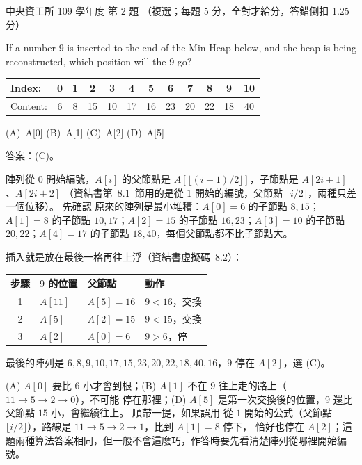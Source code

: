 \begin{pastexam}[label={px:ncu-109-dsa-02}]{中央資工所 109 學年度 第 2 題}
（複選；每題 5 分，全對才給分，答錯倒扣 1.25 分）

If a number 9 is inserted to the end of the Min-Heap below, and the heap is being reconstructed,
which position will the 9 go?
\begin{center}
\begin{tabular}{|l|c|c|c|c|c|c|c|c|c|c|c|}
\hline
Index: & 0 & 1 & 2 & 3 & 4 & 5 & 6 & 7 & 8 & 9 & 10 \\ \hline
Content: & 6 & 8 & 15 & 10 & 17 & 16 & 23 & 20 & 22 & 18 & 40 \\ \hline
\end{tabular}
\end{center}
(A)~A[0] \qquad (B)~A[1] \qquad (C)~A[2] \qquad (D)~A[5]
\end{pastexam}

\begin{pastsoln}
答案：(C)。

陣列從 $0$ 開始編號，$A[i]$ 的父節點是 $A[\lfloor (i-1)/2 \rfloor]$，子節點是 $A[2i+1]$、$A[2i+2]$
（資結書第~8.1~節用的是從 $1$ 開始的編號，父節點 $\lfloor i/2 \rfloor$，兩種只差一個位移）。 先確認
原來的陣列是最小堆積：$A[0] = 6$ 的子節點 $8, 15$；$A[1] = 8$ 的子節點 $10, 17$；$A[2] = 15$ 的子節點
$16, 23$；$A[3] = 10$ 的子節點 $20, 22$；$A[4] = 17$ 的子節點 $18, 40$，每個父節點都不比子節點大。

插入就是放在最後一格再往上浮（資結書虛擬碼~8.2）：
\begin{center}
\small
\begin{tabular}{clll}
\toprule
步驟 & $9$ 的位置 & 父節點 & 動作 \\
\midrule
1 & $A[11]$ & $A[5] = 16$ & $9 < 16$，交換 \\
2 & $A[5]$ & $A[2] = 15$ & $9 < 15$，交換 \\
3 & $A[2]$ & $A[0] = 6$ & $9 > 6$，停 \\
\bottomrule
\end{tabular}
\end{center}
最後的陣列是 $6, 8, 9, 10, 17, 15, 23, 20, 22, 18, 40, 16$，$9$ 停在 $A[2]$，選 (C)。

(A) $A[0]$ 要比 $6$ 小才會到根；(B) $A[1]$ 不在 $9$ 往上走的路上（$11 \to 5 \to 2 \to 0$），不可能
停在那裡；(D) $A[5]$ 是第一次交換後的位置，$9$ 還比父節點 $15$ 小，會繼續往上。 順帶一提，如果誤用
從 $1$ 開始的公式（父節點 $\lfloor i/2 \rfloor$），路線是 $11 \to 5 \to 2 \to 1$，比到 $A[1] = 8$ 停下，
恰好也停在 $A[2]$；這題兩種算法答案相同，但一般不會這麼巧，作答時要先看清楚陣列從哪裡開始編號。
\end{pastsoln}

